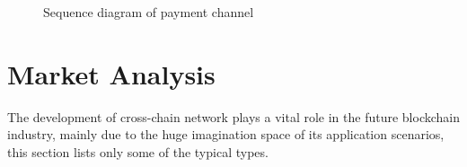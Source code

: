 \begin{figure}[H]
      \hfill
      \centering
    \caption{Sequence diagram of payment channel}
    \label{fig:dia}
\end{figure}


\section{Market Analysis}
\label{sec:market}
\noindent The development of cross-chain network plays a vital role in the future blockchain industry, mainly due to the huge imagination space of its application scenarios, this section lists only some of the typical types.\\



